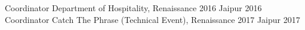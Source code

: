 \begin{cvhonors}
  \cvhonor
    {Coordinator}
    {Department of Hospitality, Renaissance 2016}
    {Jaipur}
    {2016}
  \cvhonor
    {Coordinator}
    {Catch The Phrase (Technical Event), Renaissance 2017}
    {Jaipur}
    {2017}
\end{cvhonors}